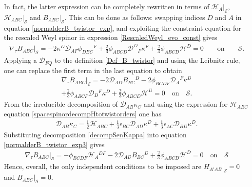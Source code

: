 \documentclass[10pt,a4paper]{article}
\theoremstyle{plain}
\begin{document}
In fact, the latter expression can be completely rewritten in terms of
$\mathcal{H}_A|_{\mathcal{S}}$, $\mathcal{H}_{ABC}|_{\mathcal{S}}$ and
$B_{ABC}|_{\mathcal{S}}$. This can be done as follows: swapping
indices $D$ and $A$ in equation \eqref{normalderB_twistor_exp}, and
exploiting the constraint equation for the rescaled Weyl spinor in
expression \eqref{RescaledWeyl_evo_const} gives
\begin{align}\label{normalderB_twistor_exp2}
\nabla_{\tau}B_{ABC}|_{\mathcal{S}}= -2 \kappa ^{D} \mathcal{D}
_{AF}\phi _{DBC}{}^{F} + \tfrac{2}{3} \phi _{ABCD} \mathcal{D}
^{D}{}_{F}\kappa ^{F} + \tfrac{2}{3}\phi_{ABCD}\mathcal{H}^D = 0
\qquad \text{on} \qquad \mathcal{S}.
\end{align}
Applying a $\mathcal{D}_{FQ}$ to the definition \eqref{Def_B_twistor}
and using the Leibnitz rule, one can replace the first term in the
last equation to obtain
\begin{multline}\label{normalderB_twistor_exp3}
\nabla_{\tau}B_{ABC}|_{\mathcal{S}}= -2 \mathcal{D} _{AD}B_{BC}{}^{D}
-2 \phi _{BCDF} \mathcal{D} _{A}{}^{F}\kappa ^{D} \\+\tfrac{2}{3} \phi
_{ABCF} \mathcal{D} _{D}{}^{F}\kappa ^{D} +
\tfrac{2}{3}\phi_{ABCD}\mathcal{H}^D = 0 \quad \text{on} \quad
\mathcal{S}.
\end{multline}
From the irreducible decomposition of $\mathcal{D} _{AB}\kappa _{C}$
and using the expression for $\mathcal{H}_{ABC}$ equation
\eqref{spacespinordecompHtotwistorders} one has
\begin{align}\label{decompSenKappa}
\mathcal{D} _{AB}\kappa _{C} = \tfrac{1}{2} \mathcal{H} _{ABC} +
\tfrac{1}{3} \epsilon _{BC} \mathcal{D} _{AD}\kappa ^{D} +
\tfrac{1}{3} \epsilon _{AC} \mathcal{D} _{BD}\kappa ^{D}.
\end{align}
Substituting decomposition \eqref{decompSenKappa} into equation
\eqref{normalderB_twistor_exp3} gives
\begin{align}
\nabla_{\tau}B_{ABC}|_{\mathcal{S}}=- \phi _{BCDF} \mathcal{H}
_{A}{}^{DF} -2 \mathcal{D} _{AD}B_{BC}{}^{D} +
\tfrac{2}{3}\phi_{ABCD}\mathcal{H}^D = 0 \quad \text{on} \quad
\mathcal{S}
\end{align}
Hence, overall, the only independent conditions to be imposed are
$H_{A'AB}|_{\mathcal{S}}=0$ and $B_{ABC}|_{\mathcal{S}}=0$.  \\
\end{document}
